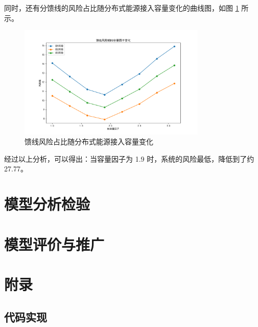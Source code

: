 \documentclass{article}
\begin{document}
同时，还有分馈线的风险占比随分布式能源接入容量变化的曲线图，如图 \ref{fig:line_risk_evolution} 所示。

\begin{figure}[htbp]
  \centering
  \includegraphics[width=0.8\textwidth]{problem2/dg_capacity_trending_feeder.png}
  \caption{馈线风险占比随分布式能源接入容量变化}
  \label{fig:line_risk_evolution}
\end{figure}

经过以上分析，可以得出：当容量因子为 1.9 时，系统的风险最低，降低到了约 27.77。

\section{模型分析检验}\label{sec:analysis_check}

\section{模型评价与推广}\label{sec:evaluation}

\section{附录}\label{sec:appendix}

\subsection{代码实现}\label{subsec:code}

\end{document}
